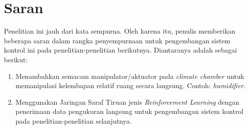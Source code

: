 \section{Saran}

Penelitian ini jauh dari kata sempurna. Oleh karena itu, penulis memberikan beberapa saran dalam rangka penyempurnaan untuk pengembangan sistem kontrol ini pada penelitian-penelitian berikutnya. Diantaranya adalah sebagai berikut:
\begin{enumerate}
	\item Menambahkan semacam manipulator/aktuator pada \textit{climate chamber} untuk memanipulasi kelembapan relatif ruang secara langsung. Contoh: \textit{humidifier}.
	\item Menggunakan Jaringan Saraf Tiruan jenis \textit{Reinforcement Learning} dengan penerimaan data pengukuran langsung untuk pengembangan sistem kontrol pada penelitian-penelitian selanjutnya.
\end{enumerate}

